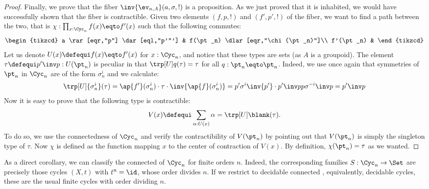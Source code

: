 \begin{proof}
  Finally, we prove that the fiber $\inv{\ev_{n,A}}(a,\sigma,!)$ is a
  proposition. As we just proved that it is inhabited, we would have
  successfully shown that the fiber is contractible. Given two elements
  $(f,p,!)$ and $(f',p',!)$ of the fiber, we want to find a path between the
  two, that is $\chi:\prod_{x:\Cyc_n} f(x) \eqto f'(x)$ such that the following
  commutes:
  \begin{displaymath}
    \begin{tikzcd}
      a \rar[eqr,"p"] \dar[eql,"p'"'] & f(\pt_n) \dlar[eqr,"\chi(\pt_n)"]\\
      f'(\pt_n) &
    \end{tikzcd}
  \end{displaymath}
  Let us denote $U(x)\defequi f(x) \eqto f'(x)$ for $x:\Cyc_n$, and notice that
  these types are sets (as $A$ is a groupoid). The element $\tau\defequi p'\inv
  p : U(\pt_n)$ is peculiar in that  $\trp[U] q (\tau) = \tau$ for all $q:\pt_n\eqto\pt_n$.
  Indeed, we use once
  again that symmetries of $\pt_n$ in $\Cyc_n$ are of the form $\sigma_n^i$ and
  we calculate:
  \begin{displaymath}
    \trp[U] {\sigma_n^i} (\tau) = \ap {f'} (\sigma_n^i) \cdot \tau \cdot \inv{\ap {f}(\sigma_n^i)}
    = p' \sigma^i \inv {p'} \cdot p'\inv p p \sigma^{-i} \inv p = p' \inv p
  \end{displaymath}
  Now it is easy to prove that the following type is contractible:
  \begin{displaymath}
    V(x) \defequi \sum_{\alpha: U(x)} \alpha = \trp[U] \blank (\tau).
  \end{displaymath}
  To do so, we use the connectedness of $\Cyc_n$ and verify the contractibility
  of $V(\pt_n)$ by pointing out that $V(\pt_n)$ is simply the singleton type of
  $\tau$. Now $\chi$ is defined as the function mapping $x$ to the center of
  contraction of $V(x)$. By definition, $\chi(\pt_n) = \tau$ as we wanted.
\end{proof}

As a direct corollary, we can classify the connected \coverings of $\Cyc_n$ for finite orders $n$.
Indeed, the corresponding families $S : \Cyc_n \to \Set$ are precisely those cycles $(X,t)$
with $t^n=\id$, \ie whose order divides $n$.
If we restrict to decidable connected \coverings, equivalently, decidable cycles,
these are the usual finite cycles with order dividing $n$.

